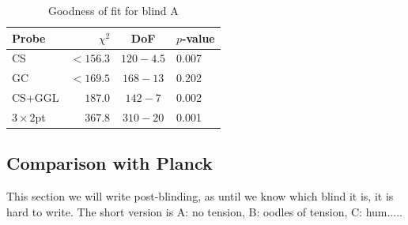 \begin{table}
	\begin{center}
		\caption{Goodness of fit for blind A}
		\label{tab:goodness-of-fit}
\begin{tabular}{lrcl}
    \toprule
    Probe             & $\chi^2$       & DoF       & $p$-value   \\
    \midrule
	CS               & $< 156.3$ & $120-4.5$ & 0.007 \\
	GC               & $< 169.5$ & $168-13$ & 0.202 \\
	CS+GGL           & $187.0$ & $142-7$ & 0.002 \\
	$3\times2$pt            & $367.8$ & $310-20$ & 0.001 \\

    \bottomrule
\end{tabular}
	\end{center}
\end{table}


\subsection{Comparison with Planck}
\label{sec:planck_comp}
This section we will write post-blinding, as until we know which blind it is, it is hard to write.   The short version is A: no tension,  B: oodles of tension,  C: hum.....



